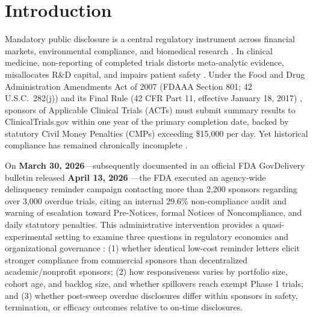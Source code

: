 \documentclass[11pt,letterpaper]{article}
\begin{document}
\begin{abstract}
\noindent\textbf{Conclusions:} The March 30, 2026 FDA outreach generated a statistically significant short-run compliance lift among overdue commercial sponsors relative to on-time peers and academic institutions, concentrated in small firms and recent backlogs without detectable spillover to exempt Phase 1 studies. However, official \texttt{HonestDiD} partial-identification bounds, Within-ACT pre-trend instability, post-hoc TOST margin selection, and low statistical power on primary efficacy p-values substantially bound causal and adverse-selection inferences.
\end{abstract}

\section{Introduction}
Mandatory public disclosure is a central regulatory instrument across financial markets, environmental compliance, and biomedical research \citep{dranove2010,jin2003,blundell2020,shimshack2005}. In clinical medicine, non-reporting of completed trials distorts meta-analytic evidence, misallocates R\&D capital, and impairs patient safety \citep{turner2008,dwan2014,krieger2021,oostrom2024}. Under the Food and Drug Administration Amendments Act of 2007 (FDAAA Section 801; 42 U.S.C.\ 282(j)) \citep{fdaaa2007} and its Final Rule (42 CFR Part 11, effective January 18, 2017) \citep{cfr2016}, sponsors of Applicable Clinical Trials (ACTs) must submit summary results to ClinicalTrials.gov within one year of the primary completion date, backed by statutory Civil Money Penalties (CMPs) exceeding \$15,000 per day. Yet historical compliance has remained chronically incomplete \citep{zarin2019,devito2020}.

On \textbf{March 30, 2026}---subsequently documented in an official FDA GovDelivery bulletin released \textbf{April 13, 2026} \citep{fda2026bulletin}---the FDA executed an agency-wide delinquency reminder campaign contacting more than 2,200 sponsors regarding over 3,000 overdue trials, citing an internal 29.6\% non-compliance audit and warning of escalation toward Pre-Notices, formal Notices of Noncompliance, and daily statutory penalties. This administrative intervention provides a quasi-experimental setting to examine three questions in regulatory economics and organizational governance \citep{becker1968,bloom2007,akerlof1970,milgrom1981}: (1) whether identical low-cost reminder letters elicit stronger compliance from commercial sponsors than decentralized academic/nonprofit sponsors; (2) how responsiveness varies by portfolio size, cohort age, and backlog size, and whether spillovers reach exempt Phase 1 trials; and (3) whether post-sweep overdue disclosures differ within sponsors in safety, termination, or efficacy outcomes relative to on-time disclosures.
\end{document}
